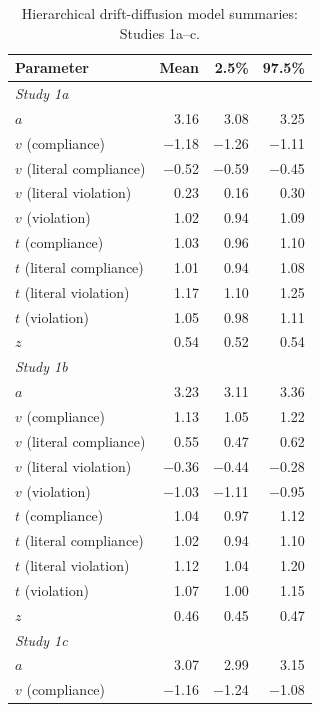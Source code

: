 \documentclass[pdflatex,sn-nature]{sn-jnl}
\begin{document}
\begin{appendices}
\begin{table}[htbp]
\caption{Hierarchical drift-diffusion model summaries: Studies 1a--c.}
\label{tab:S4}
\raggedright
\begin{tabular*}{\textwidth}{@{\extracolsep{\fill}}lrrr@{}}
\toprule
Parameter & Mean & 2.5\% & 97.5\% \\
\midrule
\multicolumn{4}{l}{\textit{Study 1a}} \\
$a$                      & 3.16  & 3.08  & 3.25  \\
$v$ (compliance)         & $-$1.18 & $-$1.26 & $-$1.11 \\
$v$ (literal compliance) & $-$0.52 & $-$0.59 & $-$0.45 \\
$v$ (literal violation)  & 0.23  & 0.16  & 0.30  \\
$v$ (violation)          & 1.02  & 0.94  & 1.09  \\
$t$ (compliance)         & 1.03  & 0.96  & 1.10  \\
$t$ (literal compliance) & 1.01  & 0.94  & 1.08  \\
$t$ (literal violation)  & 1.17  & 1.10  & 1.25  \\
$t$ (violation)          & 1.05  & 0.98  & 1.11  \\
$z$                      & 0.54  & 0.52  & 0.54  \\
\midrule
\multicolumn{4}{l}{\textit{Study 1b}} \\
$a$                      & 3.23  & 3.11  & 3.36  \\
$v$ (compliance)         & 1.13  & 1.05  & 1.22  \\
$v$ (literal compliance) & 0.55  & 0.47  & 0.62  \\
$v$ (literal violation)  & $-$0.36 & $-$0.44 & $-$0.28 \\
$v$ (violation)          & $-$1.03 & $-$1.11 & $-$0.95 \\
$t$ (compliance)         & 1.04  & 0.97  & 1.12  \\
$t$ (literal compliance) & 1.02  & 0.94  & 1.10  \\
$t$ (literal violation)  & 1.12  & 1.04  & 1.20  \\
$t$ (violation)          & 1.07  & 1.00  & 1.15  \\
$z$                      & 0.46  & 0.45  & 0.47  \\
\midrule
\multicolumn{4}{l}{\textit{Study 1c}} \\
$a$                      & 3.07  & 2.99  & 3.15  \\
$v$ (compliance)         & $-$1.16 & $-$1.24 & $-$1.08 \\

\end{tabular*}
\end{table}
\end{appendices}
\end{document}
